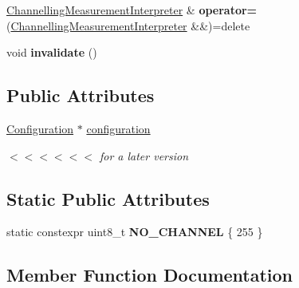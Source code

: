 \begin{DoxyCompactItemize}
\item 
\mbox{\label{classanalyzer_1_1_channelling_measurement_interpreter_ae9625728f3665e6079ff345f13419450}} 
\mbox{\hyperlink{classanalyzer_1_1_channelling_measurement_interpreter}{Channelling\+Measurement\+Interpreter}} \& {\bfseries operator=} (\mbox{\hyperlink{classanalyzer_1_1_channelling_measurement_interpreter}{Channelling\+Measurement\+Interpreter}} \&\&)=delete
\item 
\mbox{\label{classanalyzer_1_1_channelling_measurement_interpreter_aeb4fab368d35cf732274faa50e008b19}} 
void {\bfseries invalidate} ()
\end{DoxyCompactItemize}
\subsection*{Public Attributes}
\begin{DoxyCompactItemize}
\item 
\mbox{\label{classanalyzer_1_1_channelling_measurement_interpreter_aa0400f90781b78ae78980f391880f136}} 
\mbox{\hyperlink{classanalyzer_1_1_channelling_measurement_interpreter_1_1_configuration}{Configuration}} $\ast$ \mbox{\hyperlink{classanalyzer_1_1_channelling_measurement_interpreter_aa0400f90781b78ae78980f391880f136}{configuration}}
\begin{DoxyCompactList}\small\item\em $<$$<$$<$$<$$<$$<$ for a later version \end{DoxyCompactList}\end{DoxyCompactItemize}
\subsection*{Static Public Attributes}
\begin{DoxyCompactItemize}
\item 
\mbox{\label{classanalyzer_1_1_channelling_measurement_interpreter_a05285ac5828d1c55b0b7a012566966d0}} 
static constexpr uint8\+\_\+t {\bfseries N\+O\+\_\+\+C\+H\+A\+N\+N\+EL} \{ 255 \}
\end{DoxyCompactItemize}


\subsection{Member Function Documentation}
\mbox{\label{classanalyzer_1_1_channelling_measurement_interpreter_a2b92812e74d1905838afc28805121315}} 
